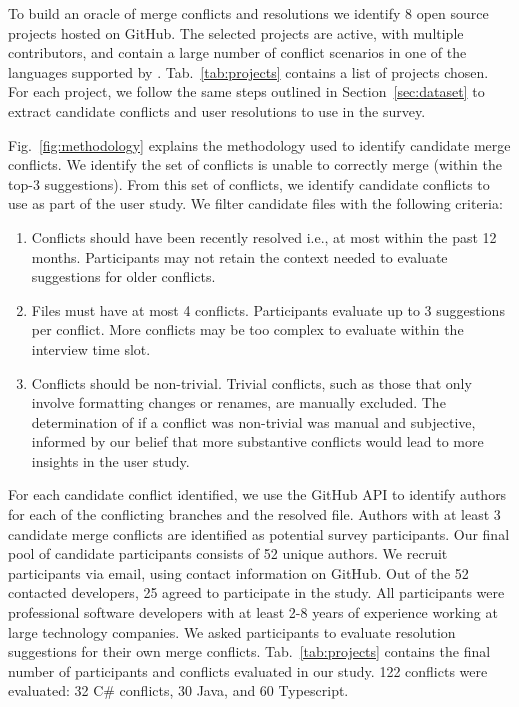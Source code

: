 To build an oracle of merge conflicts and resolutions we identify 8 open source projects hosted on GitHub. The selected projects are active, with multiple contributors, and contain a large number of conflict scenarios in one of the languages supported by \thistool{}.
Tab.~\ref{tab:projects} contains a list of projects chosen.
For each project, we follow the same steps outlined in Section~\ref{sec:dataset} to extract candidate conflicts and user resolutions to use in the survey.



Fig.~\ref{fig:methodology} explains the methodology used to identify candidate merge conflicts. We identify the set of conflicts \thistool{} is unable to correctly merge (within the top-3 suggestions). From this set of conflicts, we identify candidate conflicts to use as part of the user study. We filter candidate files with the following criteria:
\begin{enumerate}
  \item Conflicts should have been recently resolved i.e., at most within the past 12 months. Participants may not retain the context needed to evaluate suggestions for older conflicts. 
    \item Files must have at most 4 conflicts. Participants evaluate up to 3 suggestions per conflict. More conflicts may be too complex to evaluate within the interview time slot. 
    \item Conflicts should be non-trivial.  Trivial conflicts, such as those that only involve formatting changes or renames, are manually excluded. The determination of if a conflict was non-trivial was manual and subjective, informed by our belief that more substantive conflicts would lead to more insights in the user study.
\end{enumerate}

For each candidate conflict identified, we use the GitHub API to identify authors for each of the conflicting branches and the resolved file. Authors with at least 3 candidate merge conflicts are identified as potential survey participants. Our final pool of candidate participants consists of 52 unique authors. We recruit participants via email, using contact information on GitHub. Out of the 52 contacted developers, 25 agreed to participate in the study. All participants were professional software developers with at least 2-8 years of experience working at large technology companies. We asked participants to evaluate \thistool{} resolution suggestions for their own merge conflicts.  Tab.~\ref{tab:projects} contains the final number of participants and conflicts evaluated in our study. 122 conflicts were evaluated: 32 C\# conflicts, 30 Java, and 60 Typescript. 

